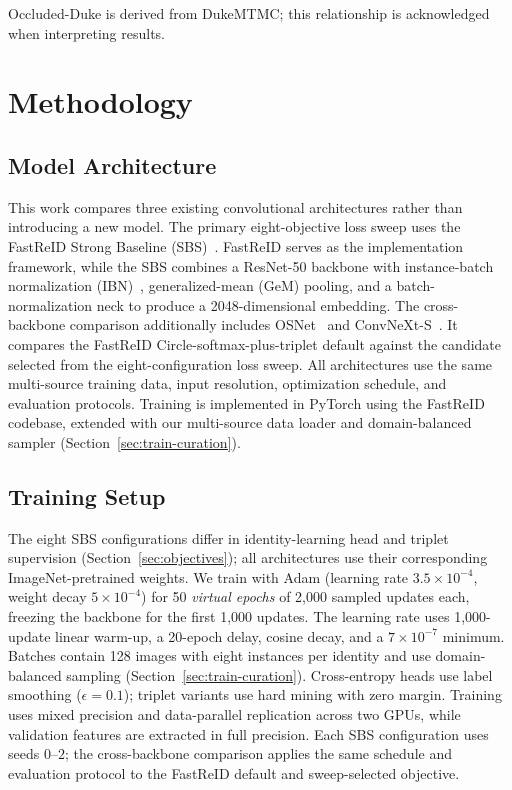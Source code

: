 \documentclass{llncs}
\begin{document}
Occluded-Duke is derived from DukeMTMC; this relationship is acknowledged when interpreting results.


\section{Methodology}
\label{sec:method}

\subsection{Model Architecture}
\label{sec:architecture}

This work compares three existing convolutional architectures rather than introducing a new model. The primary eight-objective loss sweep uses the FastReID Strong Baseline (SBS)~\cite{he2023fastreid,song2020strong}. FastReID serves as the implementation framework, while the SBS combines a ResNet-50 backbone with instance-batch normalization (IBN)~\cite{pan2018two}, generalized-mean (GeM) pooling, and a batch-normalization neck to produce a 2048-dimensional embedding. The cross-backbone comparison additionally includes OSNet~\cite{zhou2022learning} and ConvNeXt-S~\cite{liu2022convnet}. It compares the FastReID Circle-softmax-plus-triplet default against the candidate selected from the eight-configuration loss sweep. All architectures use the same multi-source training data, input resolution, optimization schedule, and evaluation protocols. Training is implemented in PyTorch using the FastReID codebase, extended with our multi-source data loader and domain-balanced sampler (Section~\ref{sec:train-curation}).

\subsection{Training Setup}
\label{sec:training}
The eight SBS configurations differ in identity-learning head and triplet supervision (Section~\ref{sec:objectives}); all architectures use their corresponding ImageNet-pretrained weights. We train with Adam (learning rate $3.5\times10^{-4}$, weight decay $5\times10^{-4}$) for 50 \emph{virtual epochs} of 2,000 sampled updates each, freezing the backbone for the first 1,000 updates. The learning rate uses 1,000-update linear warm-up, a 20-epoch delay, cosine decay, and a $7\times10^{-7}$ minimum. Batches contain 128 images with eight instances per identity and use domain-balanced sampling (Section~\ref{sec:train-curation}). Cross-entropy heads use label smoothing ($\epsilon=0.1$); triplet variants use hard mining with zero margin. Training uses mixed precision and data-parallel replication across two GPUs, while validation features are extracted in full precision. Each SBS configuration uses seeds $0$--$2$; the cross-backbone comparison applies the same schedule and evaluation protocol to the FastReID default and sweep-selected objective.
\end{document}
